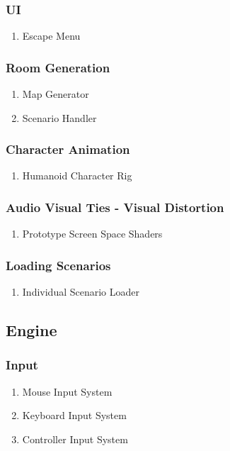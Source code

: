 \subsubsection{UI}
\begin{enumerate}
\item Escape Menu
\end{enumerate}
\subsubsection{Room Generation}
\begin{enumerate}
\item Map Generator
\item Scenario Handler
\end{enumerate}
\subsubsection{Character Animation}
\begin{enumerate}
\item Humanoid Character Rig
\end{enumerate}
\subsubsection{Audio Visual Ties - Visual Distortion}
\begin{enumerate}
\item Prototype Screen Space Shaders
\end{enumerate}
\subsubsection{Loading Scenarios}
\begin{enumerate}
\item Individual Scenario Loader
\end{enumerate}


\subsection{Engine}
\subsubsection{Input}
\begin{enumerate}
\item Mouse Input System
\item Keyboard Input System
\item Controller Input System
\end{enumerate}
